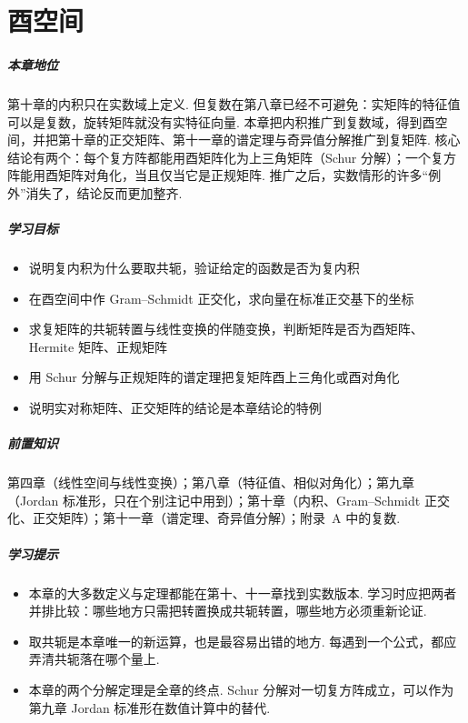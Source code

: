 	\chapter{酉空间}\label{ch:unitary}
	
	\paragraph*{本章地位}
	
	第十章的内积只在实数域上定义. 但复数在第八章已经不可避免：实矩阵的特征值可以是复数，旋转矩阵就没有实特征向量. 本章把内积推广到复数域，得到酉空间，并把第十章的正交矩阵、第十一章的谱定理与奇异值分解推广到复矩阵. 核心结论有两个：每个复方阵都能用酉矩阵化为上三角矩阵（Schur 分解）；一个复方阵能用酉矩阵对角化，当且仅当它是正规矩阵. 推广之后，实数情形的许多“例外”消失了，结论反而更加整齐.
	
	
	\paragraph*{学习目标}
	\begin{itemize}
		\item 说明复内积为什么要取共轭，验证给定的函数是否为复内积
		\item 在酉空间中作 Gram–Schmidt 正交化，求向量在标准正交基下的坐标
		\item 求复矩阵的共轭转置与线性变换的伴随变换，判断矩阵是否为酉矩阵、Hermite 矩阵、正规矩阵
		\item 用 Schur 分解与正规矩阵的谱定理把复矩阵酉上三角化或酉对角化
		\item 说明实对称矩阵、正交矩阵的结论是本章结论的特例
	\end{itemize}
	
	\paragraph*{前置知识}
	
	第四章（线性空间与线性变换）；第八章（特征值、相似对角化）；第九章（Jordan 标准形，只在个别注记中用到）；第十章（内积、Gram–Schmidt 正交化、正交矩阵）；第十一章（谱定理、奇异值分解）；附录~A 中的复数.
	
	\paragraph*{学习提示}
	\begin{itemize}
		\item 本章的大多数定义与定理都能在第十、十一章找到实数版本. 学习时应把两者并排比较：哪些地方只需把转置换成共轭转置，哪些地方必须重新论证.
		\item 取共轭是本章唯一的新运算，也是最容易出错的地方. 每遇到一个公式，都应弄清共轭落在哪个量上.
		\item 本章的两个分解定理是全章的终点. Schur 分解对一切复方阵成立，可以作为第九章 Jordan 标准形在数值计算中的替代.
	\end{itemize}
	
